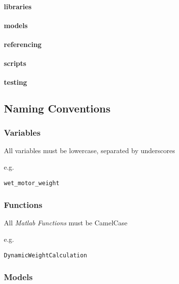 \documentclass[]{article}
\let\oldparagraph\paragraph
\renewcommand{\paragraph}[1]{\oldparagraph{#1}\mbox{}}
\begin{document}
\paragraph{libraries}\label{libraries}

\paragraph{models}\label{models}

\paragraph{referencing}\label{referencing}

\paragraph{scripts}\label{scripts}

\paragraph{testing}\label{testing}

\subsection{Naming Conventions}\label{naming-conventions}

\subsubsection{Variables}\label{variables}

All variables must be lowercase, separated by underscores

e.g.

\begin{verbatim}
wet_motor_weight
\end{verbatim}

\subsubsection{Functions}\label{functions-1}

All \emph{Matlab Functions} must be CamelCase

e.g.

\begin{verbatim}
DynamicWeightCalculation
\end{verbatim}

\subsubsection{Models}\label{models-1}
\end{document}
